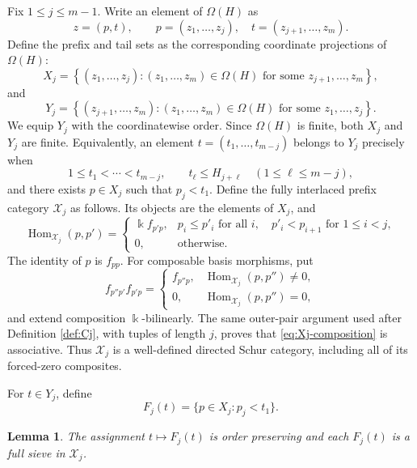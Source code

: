 \documentclass[12pt,a4paper,english,reqno]{amsart}
\theoremstyle{plain}
\newtheorem{lemma}[theorem]{Lemma}
\theoremstyle{definition}
\newcommand{\kk}{\Bbbk}
\newcommand{\Hom}{\operatorname{Hom}}
\newcommand{\X}{\mathcal X}
\begin{document}
Fix $1\leq j\leq m-1$.  Write an element of $\Omega(H)$ as
\[
 z=(p,t),\qquad
 p=(z_1,\ldots,z_j),\quad
 t=(z_{j+1},\ldots,z_m).
\]
Define the prefix and tail sets as the corresponding coordinate projections
of $\Omega(H)$:
\begin{equation}
 X_j
 =
 \left\{
 (z_1,\ldots,z_j):
 (z_1,\ldots,z_m)\in\Omega(H)
 \text{ for some }z_{j+1},\ldots,z_m
 \right\},
\label{eq:Xj-projection}
\end{equation}
and
\begin{equation}
 Y_j
 =
 \left\{
 (z_{j+1},\ldots,z_m):
 (z_1,\ldots,z_m)\in\Omega(H)
 \text{ for some }z_1,\ldots,z_j
 \right\}.
\label{eq:Yj-projection}
\end{equation}
We equip $Y_j$ with the coordinatewise order. Since $\Omega(H)$ is finite,
both $X_j$ and $Y_j$ are finite. Equivalently, an element
$t=(t_1,\ldots,t_{m-j})$ belongs to $Y_j$ precisely when
\[
 1\leq t_1<\cdots<t_{m-j},
 \qquad
 t_\ell\leq H_{j+\ell}\quad(1\leq\ell\leq m-j),
\]
and there exists $p\in X_j$ such that $p_j<t_1$.
Define the fully interlaced prefix category $\X_j$ as follows.  Its
objects are the elements of $X_j$, and
\begin{equation}
 \Hom_{\X_j}(p,p')=
 \begin{cases}
  \kk f_{p'p},&
  p_i\leq p'_i\text{ for all }i,\quad
  p'_i<p_{i+1}\text{ for }1\leq i<j,\\
  0,&\text{otherwise}.
 \end{cases}
\label{eq:Xj-hom}
\end{equation}
The identity of $p$ is $f_{pp}$.  For composable basis morphisms, put
\begin{equation}
 f_{p''p'}f_{p'p}=
 \begin{cases}
  f_{p''p},&\Hom_{\X_j}(p,p'')\neq0,\\
  0,&\Hom_{\X_j}(p,p'')=0,
 \end{cases}
\label{eq:Xj-composition}
\end{equation}
and extend composition $\kk$-bilinearly.  The same outer-pair
argument used after Definition \ref{def:Cj}, with tuples of length $j$, proves that
\eqref{eq:Xj-composition} is associative.  Thus $\X_j$ is a well-defined
directed Schur category, including all of its forced-zero composites.

For $t\in Y_j$, define
\begin{equation}
 F_j(t)=
 \{p\in X_j:p_j<t_1\}.
\label{eq:Fj}
\end{equation}

\begin{lemma}
\label{lem:Fj}
The assignment $t\mapsto F_j(t)$ is order preserving and each $F_j(t)$
is a full sieve in $\X_j$.
\end{lemma}
\end{document}
